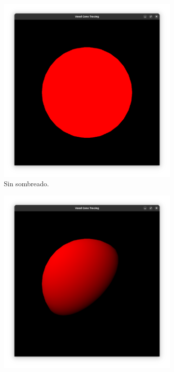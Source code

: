 \begin{figure}[h!]
    \begin{center}
    \begin{subfigure}{.49\textwidth}
        \includegraphics[width=\textwidth]{sphere-unshaded.png}
        \caption{Sin sombreado.}
    \end{subfigure}
    \begin{subfigure}{.49\textwidth}
        \includegraphics[width=\textwidth]{sphere-diffuse.png}

\end{subfigure}
\end{center}
\end{figure}
